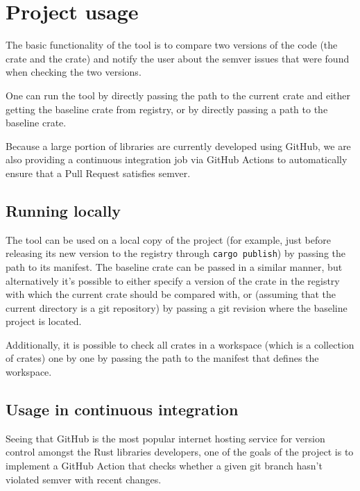 \documentclass[licencjacka,en]{pracamgr}
\begin{document}
\section{Project usage}\label{r:section_project_usage}

The basic functionality of the tool is to compare two versions of the code (the  crate
and the  crate) and notify the user about the semver issues that were found when
checking the two versions.

One can run the tool by directly passing the path to the current crate and either getting the
baseline crate from registry, or by directly passing a path to the baseline crate.

Because a large portion of libraries are currently developed using GitHub, we are also providing
a continuous integration job via GitHub Actions to automatically ensure that a Pull Request
satisfies semver.

\subsection{Running locally}\label{r:subsection_running_locally}

The tool can be used on a local copy of the project (for example, just before releasing its new
version to the registry through \texttt{cargo publish}) by passing the path to its manifest.
The baseline crate can be passed in a similar manner, but alternatively it's possible to either
specify a version of the crate in the registry with which the current crate should be compared
with, or (assuming that the current directory is a git repository) by passing a git revision where
the baseline project is located.

Additionally, it is possible to check all crates in a workspace (which is a collection of crates)
one by one by passing the path to the manifest that defines the workspace.

\subsection{Usage in continuous integration}\label{r:subsection_usage_in_ci}

Seeing that GitHub is the most popular internet hosting service for version control amongst the
Rust libraries developers, one of the goals of the project is to implement a GitHub Action that
checks whether a given git branch hasn't violated semver with recent changes.
\end{document}
